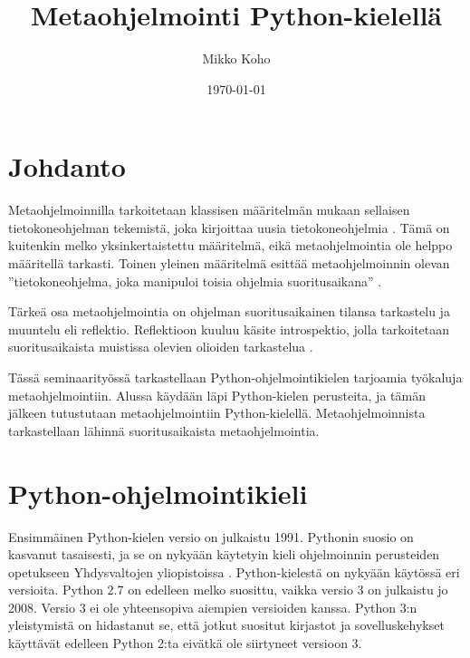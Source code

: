 \documentclass[finnish]{tktltiki2}
\title{Metaohjelmointi Python-kielellä}
\author{Mikko Koho}
\date{\today}
\theoremstyle{definition}
\theoremstyle{remark}
\begin{document}
    

\frontmatter      %

\maketitle        %

\makeabstract     %

\tableofcontents  %


\mainmatter       %


\section{Johdanto}

Metaohjelmoinnilla tarkoitetaan klassisen määritelmän mukaan sellaisen tietokoneohjelman tekemistä, joka kirjoittaa uusia tietokoneohjelmia \cite[s. 6]{hazzard2013}. Tämä on kuitenkin melko yksinkertaistettu määritelmä, eikä metaohjelmointia ole helppo määritellä tarkasti. Toinen yleinen määritelmä esittää metaohjelmoinnin olevan ''tietokoneohjelma, joka manipuloi toisia ohjelmia suoritusaikana'' \cite[s. 7]{hazzard2013}. 

Tärkeä osa metaohjelmointia on ohjelman suoritusaikainen tilansa tarkastelu ja muuntelu eli reflektio. Reflektioon kuuluu käsite introspektio, jolla tarkoitetaan suoritusaikaista muistissa olevien olioiden tarkastelua \cite{dive-into-python}.

Tässä seminaarityössä tarkastellaan Python-ohjelmointikielen tarjoamia työkaluja metaohjelmointiin. Alussa käydään läpi Python-kielen perusteita, ja tämän jälkeen tutustutaan metaohjelmointiin Python-kielellä. Metaohjelmoinnista tarkastellaan lähinnä suoritusaikaista metaohjelmointia. 



\section{Python-ohjelmointikieli}

Ensimmäinen Python-kielen versio on julkaistu 1991. Pythonin suosio on kasvanut tasaisesti, ja se on nykyään käytetyin kieli ohjelmoinnin perusteiden opetukseen Yhdysvaltojen yliopistoissa \cite{python-teaching}. Python-kielestä on nykyään käytössä eri versioita. Python 2.7 on edelleen melko suosittu, vaikka versio 3 on julkaistu jo 2008. Versio 3 ei ole yhteensopiva aiempien versioiden kanssa. Python 3:n yleistymistä on hidastanut se, että jotkut suositut kirjastot ja sovelluskehykset käyttävät edelleen Python 2:ta eivätkä ole siirtyneet versioon 3.
\end{document}
